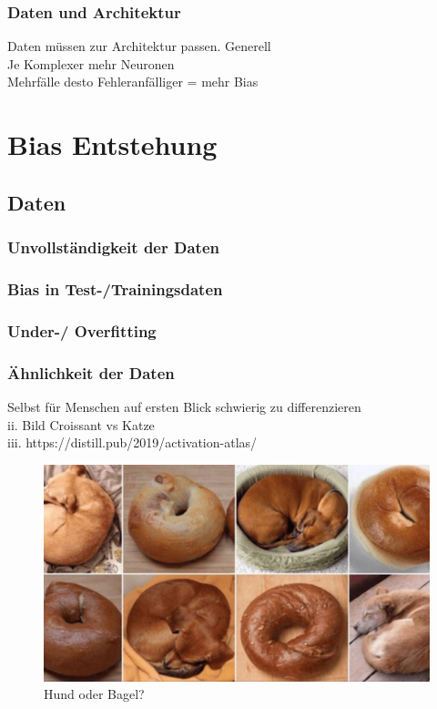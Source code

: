 \documentclass[12pt,oneside,a4paper,parskip]{scrbook}
\begin{document}
\subsection{Daten und Architektur}
Daten müssen zur Architektur passen.
Generell
\\	Je Komplexer mehr Neuronen
\\	Mehrfälle desto Fehleranfälliger = mehr Bias

\chapter{Bias Entstehung}
\section{Daten}
\subsection{Unvollständigkeit der Daten}
\subsection{Bias in Test-/Trainingsdaten}
\subsection{Under-/ Overfitting}
\subsection{Ähnlichkeit der Daten}
Selbst für Menschen auf ersten Blick schwierig zu differenzieren 
\\ii.	Bild Croissant vs Katze
\\iii.	https://distill.pub/2019/activation-atlas/

\begin{figure}[h]
	\begin{center}
		\includegraphics[width=15cm]{Bilder/dog_or_bagel.jpg}
		\caption{Hund oder Bagel?}
		\label{Hund oder Bagel?}
	\end{center}
\end{figure}
\end{document}
